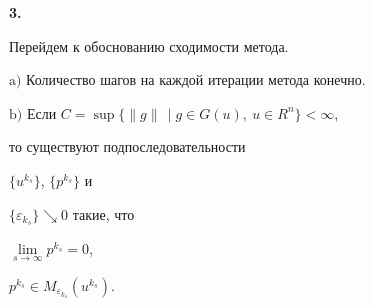 {\bf 3.}


Перейдем к обоснованию сходимости метода.





\begin{thm}


\label{thm:1}


$\mathrm{a)}$ Количество шагов на каждой итерации метода конечно.





$\mathrm{b)}$ Если $C=\sup


\{\|g\|\,\mid g \in G(u),\ u\in R^{n} \}< \infty $,


то существуют подпоследовательности


$\{u^{k_{s}}\}$, $\{p^{k_{s}}\}$ и


$\{\varepsilon_{k_{s}} \} \searrow 0$ такие, что


$\lim\limits_{s \to \infty } p^{k_{s}} = 0$,


$p^{k_{s}} \in M _{\varepsilon_{k_{s}}} (u^{k_{s}})$.


\end{thm}





